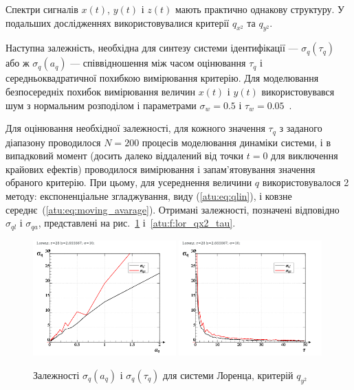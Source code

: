 Спектри сигналів $x(t)$, $y(t)$ і $z(t)$ мають практично однакову
структуру. У подальших дослідженнях використовувалися критерії
$q_{x^2}$ та
$q_{y^2}$.

Наступна залежність, необхідна для синтезу системи
ідентифікації ---
$ \sigma_q (\tau_q) $ або ж
$ \sigma_q (a_q) $ --- співвідношення між часом оцінювання
$ \tau_q $ і середньоквадратичної похибкою вимірювання критерію. Для
моделювання безпосередніх похибок вимірювання величин
$ x (t) $ і
$ y (t) $ використовувався шум з нормальним розподілом і
параметрами
$ \sigma_w = 0.5 $ і
$ \tau_w = 0.05 $~\cite{atu_asau26}.

Для оцінювання необхідної залежності, для кожного значення
$ \tau_q $ з заданого діапазону проводилося
$ N = 200 $ процесів моделювання динаміки системи, і в випадковий
момент (досить далеко віддалений від точки
$ t = 0 $ для виключення крайових ефектів) проводилося вимірювання
і запам'ятовування значення обраного критерію. При цьому, для усереднення
величини
$ q $ використовувалося 2 методу: експоненціальне згладжування,
виду (\ref{atu:eq:qlin}), і ковзне середнє~(\ref{atu:eq:moving_avarage}). Отримані
залежності, позначені відповідно
$ \sigma_{ql} $ і
$ \sigma_{qa} $, представлені на рис.~\ref{atu:f:lor_qy2_tau} і~\ref{atu:f:lor_qx2_tau}.


\begin{figure}[ht!]
\begin{center}
  \includegraphics[width=0.49\textwidth]{p/cha/lor/lor_q_tau-p_aq_sd.png}
  \hfill
  \includegraphics[width=0.49\textwidth]{p/cha/lor/lor_q_tau-p_tau_sd.png}
\end{center}
\caption{Залежності $ \sigma_{q} (a_q) $ і $ \sigma_{q} (\tau_q) $ для системи Лоренца, критерій $q_{y^2}$}
\label{atu:f:lor_qy2_tau}
\end{figure}


